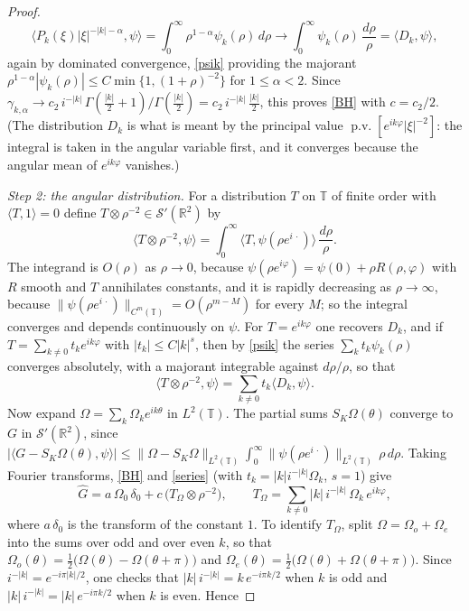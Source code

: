 \documentclass{article}
\def\R{{\mathbb R}}
\def\T{{\mathbb T}}
\newcommand{\pv}{\operatorname{p.v.}}
\begin{document}
\begin{proof}
		$$\big\langle P_k(\xi)|\xi|^{-|k|-\alpha},\psi\big\rangle=\int_0^\infty\rho^{1-\alpha}\psi_k(\rho)\,d\rho\longrightarrow\int_0^\infty\psi_k(\rho)\,\frac{d\rho}\rho=\langle D_k,\psi\rangle,$$
		again by dominated convergence, \eqref{psik} providing the majorant $\rho^{1-\alpha}|\psi_k(\rho)|\leq C\min\{1,(1+\rho)^{-2}\}$ for $1\leq\alpha<2$. Since $\gamma_{k,\alpha}\to c_2\,i^{-|k|}\,\Gamma(\frac{|k|}2+1)/\Gamma(\frac{|k|}2)=c_2\,i^{-|k|}\,\frac{|k|}2$, this proves \eqref{BH} with $c=c_2/2$. (The distribution $D_k$ is what is meant by the principal value $\pv[e^{ik\varphi}|\xi|^{-2}]$: the integral is taken in the angular variable first, and it converges because the angular mean of $e^{ik\varphi}$ vanishes.)

		\emph{Step 2: the angular distribution.} For a distribution $T$ on $\T$ of finite order with $\langle T,1\rangle=0$ define $T\otimes\rho^{-2}\in\mathcal S'(\R^2)$ by
		$$\big\langle T\otimes\rho^{-2},\psi\big\rangle=\int_0^\infty\big\langle T,\psi(\rho e^{i\,\cdot})\big\rangle\,\frac{d\rho}\rho .$$
		The integrand is $O(\rho)$ as $\rho\to0$, because $\psi(\rho e^{i\varphi})=\psi(0)+\rho R(\rho,\varphi)$ with $R$ smooth and $T$ annihilates constants, and it is rapidly decreasing as $\rho\to\infty$, because $\|\psi(\rho e^{i\,\cdot})\|_{C^m(\T)}=O(\rho^{m-M})$ for every $M$; so the integral converges and depends continuously on $\psi$. For $T=e^{ik\varphi}$ one recovers $D_k$, and if $T=\sum_{k\neq0}t_ke^{ik\varphi}$ with $|t_k|\leq C|k|^s$, then by \eqref{psik} the series $\sum_kt_k\psi_k(\rho)$ converges absolutely, with a majorant integrable against $d\rho/\rho$, so that
		\begin{equation}\label{series}
			\big\langle T\otimes\rho^{-2},\psi\big\rangle=\sum_{k\neq0}t_k\langle D_k,\psi\rangle .
		\end{equation}
		Now expand $\Omega=\sum_k\Omega_ke^{ik\theta}$ in $L^2(\T)$. The partial sums $S_K\Omega(\theta)$ converge to $G$ in $\mathcal S'(\R^2)$, since $|\langle G-S_K\Omega(\theta),\psi\rangle|\leq\|\Omega-S_K\Omega\|_{L^2(\T)}\int_0^\infty\|\psi(\rho e^{i\,\cdot})\|_{L^2(\T)}\,\rho\,d\rho$. Taking Fourier transforms, \eqref{BH} and \eqref{series} (with $t_k=|k|i^{-|k|}\Omega_k$, $s=1$) give
		\begin{equation}\label{Ghat}
			\hat G=a\,\Omega_0\,\delta_0+c\,\big(T_\Omega\otimes\rho^{-2}\big),\qquad T_\Omega=\sum_{k\neq0}|k|\,i^{-|k|}\,\Omega_k\,e^{ik\varphi},
		\end{equation}
		where $a\,\delta_0$ is the transform of the constant $1$. To identify $T_\Omega$, split $\Omega=\Omega_o+\Omega_e$ into the sums over odd and over even $k$, so that $\Omega_o(\theta)=\frac12\big(\Omega(\theta)-\Omega(\theta+\pi)\big)$ and $\Omega_e(\theta)=\frac12\big(\Omega(\theta)+\Omega(\theta+\pi)\big)$. Since $i^{-|k|}=e^{-i\pi|k|/2}$, one checks that $|k|\,i^{-|k|}=k\,e^{-i\pi k/2}$ when $k$ is odd and $|k|\,i^{-|k|}=|k|\,e^{-i\pi k/2}$ when $k$ is even. Hence

\end{proof}
\end{document}
